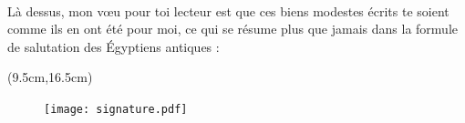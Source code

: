 {  \paragraph{}
  Là dessus, mon vœu pour toi lecteur est que ces biens modestes écrits te soient comme ils en ont été pour moi, ce qui se résume plus que jamais dans la formule de salutation des Égyptiens antiques :

  \begin{textblock*}{3cm}(9.5cm,16.5cm) 
    \begin{figure}[h]
      \begin{flushright}
        \texttt{[image: signature.pdf]}
        \captionsetup{labelformat=empty}
      \end{flushright}
    \end{figure}
  \end{textblock*}
}
